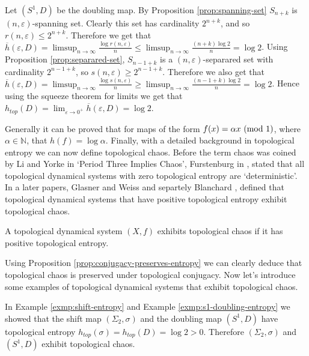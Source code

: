 \begin{exmp} \label{exmp:s1-doubling-entropy}
    Let $(S^1, D)$ be the doubling map. By Proposition \ref{prop:spanning-set} $S_{n+k}$ is $(n, \varepsilon)$-spanning set. Clearly this set has cardinality $2^{n+k}$, and so $r(n, \varepsilon) \leq 2^{n+k}$. Therefore we get that $\overline{h}(\varepsilon, D) = \limsup_{n \to \infty}\frac{\log{r(n, \varepsilon)}}{n} \leq \limsup_{n\to\infty}\frac{(n + k)\log 2}{n} = \log 2$. Using Proposition \ref{prop:separared-set}, $S_{n - 1 + k}$ is a $(n, \varepsilon)$-separared set with cardinality $2^{n - 1 + k}$, so $s(n, \varepsilon) \geq 2^{n - 1 + k}$. Therefore we also get that $\overline{h}(\varepsilon, D) = \limsup_{n \to \infty}\frac{\log s(n, \varepsilon)}{n} \geq \limsup_{n \to \infty}\frac{(n - 1 + k)\log 2}{n} = \log 2$. Hence using the squeeze theorem for limits we get that $h_{top}(D) = \lim_{\varepsilon \to 0^+}\overline{h}(\varepsilon, D) = \log 2$.
\end{exmp}

Generally it can be proved that for maps of the form $f(x) = \alpha x \ (\mathrm{mod}\ 1)$, where $\alpha \in \mathbb{N}$, that $h(f) = \log \alpha$. Finally, with a detailed background in topological entropy we can now define topological chaos. Before the term chaos was coined by Li and Yorke in `Period Three Implies Chaos', Furstenburg in \cite{furstenberg}, stated that all topological dynamical systems with zero topological entropy are `deterministic'. In a later papers, Glasner and Weiss \cite{glasner-weiss} and separtely Blanchard \cite{blanchard}, defined that topological dynamical systems that have positive topological entropy exhibit topological chaos.

\begin{defn}
    A topological dynamical system $(X, f)$ exhibits topological chaos if it has positive topological entropy.
\end{defn}

Using Proposition \ref{prop:conjugacy-preserves-entropy} we can clearly deduce that topological chaos is preserved under topological conjugacy. Now let's introduce some examples of topological dynamical systems that exhibit topological chaos.

\begin{exmp}
    In Example \ref{exmp:shift-entropy} and Example \ref{exmp:s1-doubling-entropy} we showed that the shift map $(\Sigma_2, \sigma)$ and the doubling map $(S^1, D)$ have topological entropy $h_{top}(\sigma) = h_{top}(D) = \log 2 > 0$. Therefore $(\Sigma_2, \sigma)$ and $(S^1, D)$ exhibit topological chaos.
\end{exmp}

